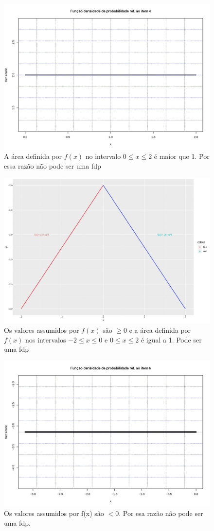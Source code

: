\documentclass[
]{book}
\begin{document}
\hfill\break

\begin{figure}

{\centering \includegraphics[width=0.6\linewidth]{images6/item4} 

}

\caption{A área definida por $f(x)$ no intervalo $0 \le x \le 2$ é maior que 1. Por essa razão não pode ser uma fdp}\label{fig:fig19}
\end{figure}

\hfill\break

\begin{figure}

{\centering \includegraphics[width=0.6\linewidth]{images6/item5} 

}

\caption{Os valores assumidos por $f(x)$ são $\ge 0$ e a área definida por $f(x)$ nos intervalos $-2 \le x \le 0$ e $0 \le x \le 2$ é igual a 1. Pode ser uma fdp}\label{fig:fig20}
\end{figure}

\hfill\break

\begin{figure}

{\centering \includegraphics[width=0.6\linewidth]{images6/item6} 

}

\caption{Os valores assumidos por f(x) são $ < 0$. Por esa razão não pode ser uma fdp.}\label{fig:fig21}
\end{figure}
\end{document}
